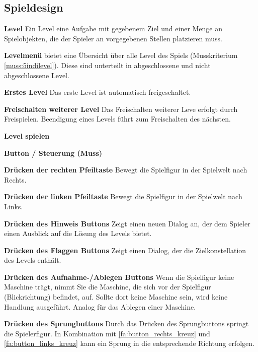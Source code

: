 \documentclass{scrartcl}
\begin{document}
\subsection{Spieldesign}

\begin{falist}[resume]
	\item \label{fa:level} \textbf{Level} Ein Level eine Aufgabe mit gegebenem Ziel und einer Menge an Spielobjekten, die der Spieler an vorgegebenen Stellen platzieren muss.
	\item \label{fa:levelmenue} \textbf{Levelmenü} bietet eine Übersicht über alle Level des Spiels (Musskriterium \ref{muss:5indilevel}). Diese sind unterteilt in abgeschlossene und nicht abgeschlossene Level.
    \begin{falist}
        \item \textbf{Erstes Level} Das erste Level ist automatisch freigeschaltet.
        \item \textbf{Freischalten weiterer Level} Das Freischalten weiterer Leve erfolgt durch Freispielen. Beendigung eines Levels führt zum Freischalten des nächsten.
    \end{falist}
    \item \label{fa:spielen} \textbf{Level spielen}
    \item \label{fa:buttons_muss} \textbf{Button / Steuerung (Muss)}
    \begin{falist}
    	\item \label{fa:button_rechts_kreuz} \textbf{Drücken der rechten Pfeiltaste} Bewegt die Spielfigur in der Spielwelt nach Rechts.
    	\item \label{fa:button_links_kreuz} \textbf{Drücken der linken Pfeiltaste} Bewegt die Spielfigur in der Spielwelt nach Links.
    	\item \label{fa:button_lampe} \textbf{Drücken des Hinweis Buttons} Zeigt einen neuen Dialog an, der dem Spieler einen Ausblick auf die Lösung des Levels bietet.
    	\item \label{fa:button_flagge} \textbf{Drücken des Flaggen Buttons} Zeigt einen Dialog, der die Zielkonstellation des Levels enthält.
    	\item \label{fa:button_aufnehmen_ablegen} \textbf{Drücken des Aufnahme-/Ablegen Buttons} Wenn die Spielfigur keine Maschine trägt, nimmt Sie die Maschine, die sich vor der Spielfigur (Blickrichtung) befindet, auf. Sollte dort keine Maschine sein, wird keine Handlung ausgeführt. Analog für das Ablegen einer Maschine.
    	\item \label{fa:button_jump} \textbf{Drücken des Sprungbuttons} Durch das Drücken des Sprungbuttons springt die Spielerfigur. In Kombination mit \ref{fa:button_rechts_kreuz} und \ref{fa:button_links_kreuz} kann ein Sprung in die entsprechende Richtung erfolgen.

\end{falist}
\end{falist}
\end{document}
